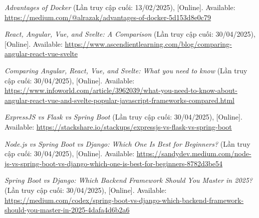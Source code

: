 \documentclass[12pt, a4paper]{article}
\begin{document}
\begin{thebibliography}{}
 \textit{Advantages of Docker} (Lần truy cập cuối: 13/02/2025), [Online]. Available: \url{https://medium.com/@alrazak/advantages-of-docker-5d153d8e0c79}

 \textit{React, Angular, Vue, and Svelte: A Comparison} (Lần truy cập cuối: 30/04/2025), [Online]. Available: \url{https://www.ascendientlearning.com/blog/comparing-angular-react-vue-svelte}

 \textit{Comparing Angular, React, Vue, and Svelte: What you need to know} (Lần truy cập cuối: 30/04/2025), [Online]. Available: \url{https://www.infoworld.com/article/3962039/what-you-need-to-know-about-angular-react-vue-and-svelte-popular-javascript-frameworks-compared.html}

 \textit{ExpressJS vs Flask vs Spring Boot} (Lần truy cập cuối: 30/04/2025), [Online]. Available: \url{https://stackshare.io/stackups/expressjs-vs-flask-vs-spring-boot}

 \textit{Node.js vs Spring Boot vs Django: Which One Is Best for Beginners?} (Lần truy cập cuối: 30/04/2025), [Online]. Available: \url{https://sandydev.medium.com/node-js-vs-spring-boot-vs-django-which-one-is-best-for-beginners-8782d3be54}

 \textit{Spring Boot vs Django: Which Backend Framework Should You Master in 2025?} (Lần truy cập cuối: 30/04/2025), [Online]. Available: \url{https://medium.com/codex/spring-boot-vs-django-which-backend-framework-should-you-master-in-2025-4dafa4d6b2a6}
\end{thebibliography}
  
% 
\end{document}
